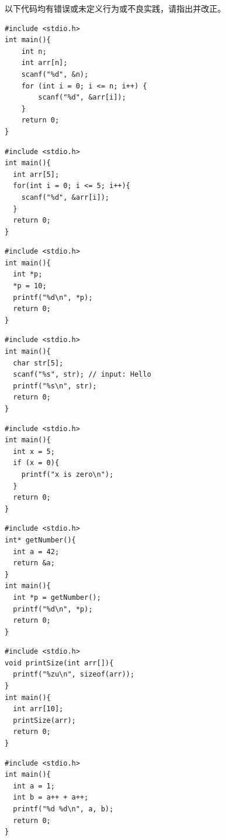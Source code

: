 \begin{exercise}[改错练习]
    以下代码均有错误或未定义行为或不良实践，请指出并改正。

\begin{verbatim}
#include <stdio.h>
int main(){
    int n;
    int arr[n];
    scanf("%d", &n);
    for (int i = 0; i <= n; i++) {
        scanf("%d", &arr[i]);
    }
    return 0;
}
\end{verbatim}

\begin{verbatim}
#include <stdio.h>
int main(){
  int arr[5];
  for(int i = 0; i <= 5; i++){
    scanf("%d", &arr[i]);
  }
  return 0;
}
\end{verbatim}

\begin{verbatim}
#include <stdio.h>
int main(){
  int *p;
  *p = 10;
  printf("%d\n", *p);
  return 0;
}
\end{verbatim}

\begin{verbatim}
#include <stdio.h>
int main(){
  char str[5];
  scanf("%s", str); // input: Hello
  printf("%s\n", str);
  return 0;
}
\end{verbatim}

\begin{verbatim}
#include <stdio.h>
int main(){
  int x = 5;
  if (x = 0){ 
    printf("x is zero\n");
  }
  return 0;
}
\end{verbatim}

\begin{verbatim}
#include <stdio.h>
int* getNumber(){
  int a = 42;
  return &a; 
}
int main(){
  int *p = getNumber();
  printf("%d\n", *p); 
  return 0;
}
\end{verbatim}

\begin{verbatim}
#include <stdio.h>
void printSize(int arr[]){
  printf("%zu\n", sizeof(arr));
}
int main(){
  int arr[10];
  printSize(arr);
  return 0;
}
\end{verbatim}

\begin{verbatim}
#include <stdio.h>
int main(){
  int a = 1;
  int b = a++ + a++; 
  printf("%d %d\n", a, b);
  return 0;
}
\end{verbatim}

\end{exercise}

